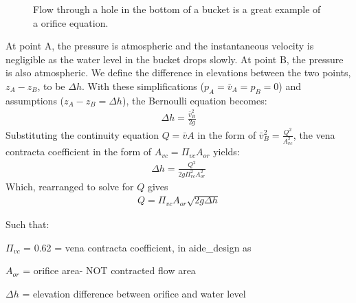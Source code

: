 \documentclass[letterpaper,10pt,english]{sphinxmanual}
\let\sphinxpxdimen\pdfpxdimen\else\newdimen\sphinxpxdimen
\begin{document}
\begin{figure}[htbp]
\centering
\capstart

\noindent\sphinxincludegraphics[width=650\sphinxpxdimen]{{hole_in_a_bucket}.png}
\caption{Flow through a hole in the bottom of a bucket is a great example of a orifice equation.}\label{\detokenize{Fluids_Review/Fluids_Review_Design:id22}}\label{\detokenize{Fluids_Review/Fluids_Review_Design:hole-in-a-bucket}}\end{figure}

At point A, the pressure is atmospheric and the instantaneous velocity is negligible as the water level in the bucket drops slowly. At point B, the pressure is also atmospheric. We define the difference in elevations between the two points, \(z_A - z_B\), to be \(\Delta h\). With these simplifications (\(p_A = \bar v_A = p_B = 0\)) and assumptions (\(z_A - z_B = \Delta h\)), the Bernoulli equation becomes:
\begin{equation}\label{equation:Fluids_Review/Fluids_Review_Design:Fluids_Review/Fluids_Review_Design:29}
\begin{split}\Delta h = \frac{\bar v_B^2}{2g}\end{split}
\end{equation}
Substituting the continuity equation \(Q = \bar v A\) in the form of \(\bar v_B^2 = \frac{Q^2}{A_{vc}^2}\), the vena contracta coefficient in the form of \(A_{vc} = \Pi_{vc} A_{or}\) yields:
\begin{equation}\label{equation:Fluids_Review/Fluids_Review_Design:Fluids_Review/Fluids_Review_Design:30}
\begin{split}\Delta h = \frac{Q^2}{2g \Pi_{vc}^2 A_{or}^2}\end{split}
\end{equation}
Which, rearranged to solve for \(Q\) gives 
\begin{equation}\label{equation:Fluids_Review/Fluids_Review_Design:orifice_equation}
\begin{split}  Q = \Pi_{vc} A_{or} \sqrt{2g\Delta h}\end{split}
\end{equation}
\begin{DUlineblock}{0em}
\item[] Such that:
\item[] \(\Pi_{vc}\) = 0.62 = vena contracta coefficient, in aide\_design as 
\item[] \(A_{or}\) = orifice area- NOT contracted flow area
\item[] \(\Delta h\) = elevation difference between orifice and water level
\end{DUlineblock}
\end{document}

